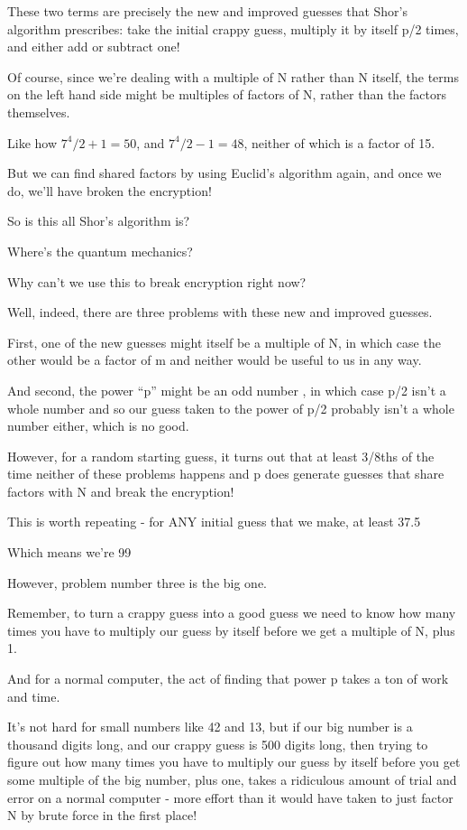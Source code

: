 \documentclass[../main.tex]{subfiles}
\begin{document}
These two terms are precisely the new and improved guesses that Shor’s algorithm prescribes: take the initial crappy guess, multiply it by itself p/2 times, and either add or subtract one!

Of course, since we’re dealing with a multiple of N rather than N itself, the terms on the left hand side might be multiples of factors of N, rather than the factors themselves.

Like how $7^4/2+1 = 50$, and $7^4/2-1 = 48$, neither of which is a factor of 15.

But we can find shared factors by using Euclid’s algorithm again, and once we do, we’ll have broken the encryption!

So is this all Shor’s algorithm is?

Where’s the quantum mechanics?

Why can’t we use this to break encryption right now?

Well, indeed, there are three problems with these new and improved guesses.

First, one of the new guesses might itself be a multiple of N, in which case the other would be a factor of m and neither would be useful to us in any way.

And second, the power “p” might be an odd number , in which case p/2 isn’t a whole number and so our guess taken to the power of p/2 probably isn’t a whole number either, which is no good.

However, for a random starting guess, it turns out that at least 3/8ths of the time neither of these problems happens and p does generate guesses that share factors with N and break the encryption!

This is worth repeating - for ANY initial guess that we make, at least 37.5%

Which means we’re 99%

However, problem number three is the big one.

Remember, to turn a crappy guess into a good guess we need to know how many times you have to multiply our guess by itself before we get a multiple of N, plus 1.

And for a normal computer, the act of finding that power p takes a ton of work and time.

It’s not hard for small numbers like 42 and 13, but if our big number is a thousand digits long, and our crappy guess is 500 digits long, then trying to figure out how many times you have to multiply our guess by itself before you get some multiple of the big number, plus one, takes a ridiculous amount of trial and error on a normal computer - more effort than it would have taken to just factor N by brute force in the first place!
\end{document}
